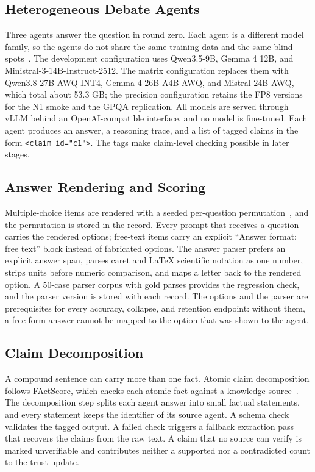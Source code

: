 \documentclass[a4paper,fleqn]{cas-sc}
\begin{document}
\subsection{Heterogeneous Debate Agents}
Three agents answer the question in round zero. Each agent is a different model family, so the agents do not share the same training data and the same blind spots~\cite{estornell2024multillm}. The development configuration uses Qwen3.5-9B, Gemma 4 12B, and Ministral-3-14B-Instruct-2512. The matrix configuration replaces them with Qwen3.8-27B-AWQ-INT4, Gemma 4 26B-A4B AWQ, and Mistral 24B AWQ, which total about 53.3 GB; the precision configuration retains the FP8 versions for the N1 smoke and the GPQA replication. All models are served through vLLM behind an OpenAI-compatible interface, and no model is fine-tuned. Each agent produces an answer, a reasoning trace, and a list of tagged claims in the form \texttt{<claim id="c1">}. The tags make claim-level checking possible in later stages.

\subsection{Answer Rendering and Scoring}
Multiple-choice items are rendered with a seeded per-question permutation~\cite{zheng2024mcqbias}, and the permutation is stored in the record. Every prompt that receives a question carries the rendered options; free-text items carry an explicit ``Answer format: free text'' block instead of fabricated options. The answer parser prefers an explicit answer span, parses caret and LaTeX scientific notation as one number, strips units before numeric comparison, and maps a letter back to the rendered option. A 50-case parser corpus with gold parses provides the regression check, and the parser version is stored with each record. The options and the parser are prerequisites for every accuracy, collapse, and retention endpoint: without them, a free-form answer cannot be mapped to the option that was shown to the agent.

\subsection{Claim Decomposition}
A compound sentence can carry more than one fact. Atomic claim decomposition follows FActScore, which checks each atomic fact against a knowledge source~\cite{min2023factscore}. The decomposition step splits each agent answer into small factual statements, and every statement keeps the identifier of its source agent. A schema check validates the tagged output. A failed check triggers a fallback extraction pass that recovers the claims from the raw text. A claim that no source can verify is marked unverifiable and contributes neither a supported nor a contradicted count to the trust update.
\end{document}
